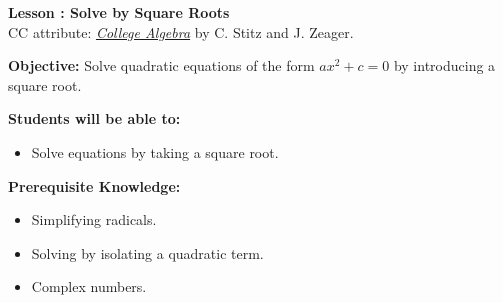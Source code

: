 \documentclass[12pt]{article}
\theoremstyle{definition}
\begin{document}
{\bf \large Lesson : Solve by Square Roots}
\\ CC attribute: \href{http://www.stitz-zeager.com}{\it{College Algebra}} by C. Stitz and J. Zeager. 
\hfill \doclicenseImage[imagewidth=5em]\\
\par
{\bf Objective:} Solve quadratic equations of the form $ax^2+c=0$ by introducing a square root.\\
\par
{\bf Students will be able to:}
\begin{itemize}
	\item Solve equations by taking a square root.
\end{itemize}
{\bf Prerequisite Knowledge:}
\begin{itemize}
	\item Simplifying radicals.
	\item Solving by isolating a quadratic term.
	\item Complex numbers.
\end{itemize}
\hrulefill
\end{document}

